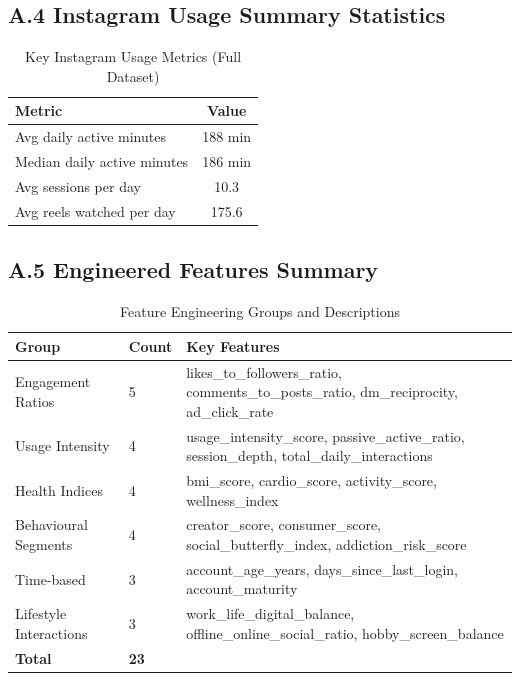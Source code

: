 \documentclass[12pt,a4paper]{article}
\begin{document}
\subsection*{A.4 Instagram Usage Summary Statistics}
 
\begin{table}[H]
\centering
\caption{Key Instagram Usage Metrics (Full Dataset)}
\begin{tabular}{lc}
\toprule
\textbf{Metric} & \textbf{Value} \\
\midrule
Avg daily active minutes   & 188 min \\
Median daily active minutes & 186 min \\
Avg sessions per day       & 10.3 \\
Avg reels watched per day  & 175.6 \\
\bottomrule
\end{tabular}
\end{table}
 
\subsection*{A.5 Engineered Features Summary}
 
\begin{table}[H]
\centering
\caption{Feature Engineering Groups and Descriptions}
\begin{tabular}{llp{7cm}}
\toprule
\textbf{Group} & \textbf{Count} & \textbf{Key Features} \\
\midrule
Engagement Ratios    & 5 & likes\_to\_followers\_ratio, comments\_to\_posts\_ratio, dm\_reciprocity, ad\_click\_rate \\
Usage Intensity      & 4 & usage\_intensity\_score, passive\_active\_ratio, session\_depth, total\_daily\_interactions \\
Health Indices       & 4 & bmi\_score, cardio\_score, activity\_score, wellness\_index \\
Behavioural Segments & 4 & creator\_score, consumer\_score, social\_butterfly\_index, addiction\_risk\_score \\
Time-based           & 3 & account\_age\_years, days\_since\_last\_login, account\_maturity \\
Lifestyle Interactions & 3 & work\_life\_digital\_balance, offline\_online\_social\_ratio, hobby\_screen\_balance \\
\midrule
\textbf{Total} & \textbf{23} & \\
\bottomrule
\end{tabular}
\end{table}
\end{document}
